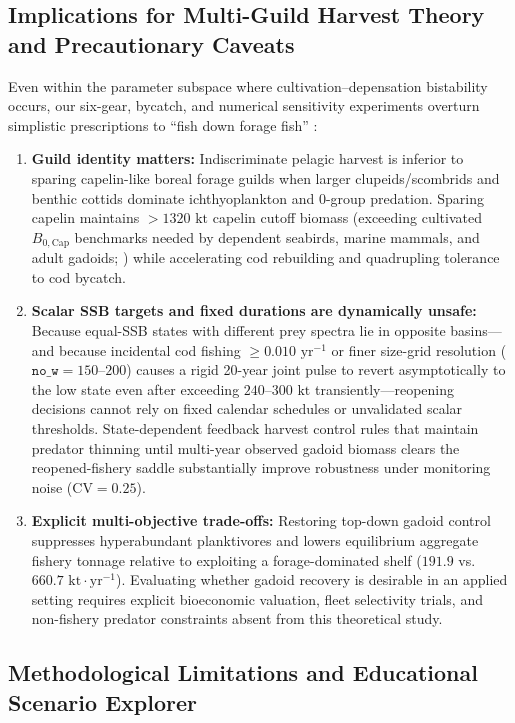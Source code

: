 \documentclass[11pt,letterpaper]{article}
\begin{document}
\subsection{Implications for Multi-Guild Harvest Theory and Precautionary Caveats}

Even within the parameter subspace where cultivation--depensation bistability occurs, our six-gear, bycatch, and numerical sensitivity experiments overturn simplistic prescriptions to ``fish down forage fish'' \citep{pikitch2014global,garcia2012reconsidering}:
\begin{enumerate}
  \item \textbf{Guild identity matters:} Indiscriminate pelagic harvest is inferior to sparing capelin-like boreal forage guilds when larger clupeids/scombrids and benthic cottids dominate ichthyoplankton and $0$-group predation. Sparing capelin maintains $> 1320\text{ kt}$ capelin cutoff biomass (exceeding cultivated $B_{0,\mathrm{Cap}}$ benchmarks needed by dependent seabirds, marine mammals, and adult gadoids; \citealt{rose2002capelin,pikitch2014global}) while accelerating cod rebuilding and quadrupling tolerance to cod bycatch.
  \item \textbf{Scalar SSB targets and fixed durations are dynamically unsafe:} Because equal-SSB states with different prey spectra lie in opposite basins---and because incidental cod fishing $\ge 0.010\text{ yr}^{-1}$ or finer size-grid resolution ($\texttt{no\_w} = 150$--$200$) causes a rigid 20-year joint pulse to revert asymptotically to the low state even after exceeding $240$--$300\text{ kt}$ transiently---reopening decisions cannot rely on fixed calendar schedules or unvalidated scalar thresholds. State-dependent feedback harvest control rules that maintain predator thinning until multi-year observed gadoid biomass clears the reopened-fishery saddle substantially improve robustness under monitoring noise ($\mathrm{CV} = 0.25$).
  \item \textbf{Explicit multi-objective trade-offs:} Restoring top-down gadoid control suppresses hyperabundant planktivores and lowers equilibrium aggregate fishery tonnage relative to exploiting a forage-dominated shelf ($191.9$ vs.\ $660.7\text{ kt}\cdot\text{yr}^{-1}$). Evaluating whether gadoid recovery is desirable in an applied setting requires explicit bioeconomic valuation, fleet selectivity trials, and non-fishery predator constraints absent from this theoretical study.
\end{enumerate}

\subsection{Methodological Limitations and Educational Scenario Explorer}
\end{document}
